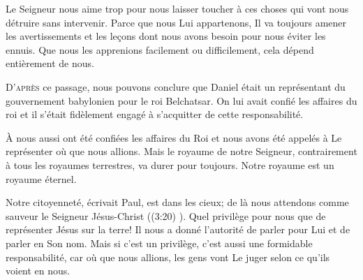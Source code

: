Le Seigneur nous aime trop pour nous laisser toucher à ces choses
 qui vont nous détruire sans intervenir. Parce que nous Lui appartenons,
 Il va toujours amener les avertissements et les le\c{c}ons
 dont nous avons besoin pour nous éviter les ennuis.
 Que nous les apprenions facilement ou difficilement,
 cela dépend entièrement de nous. 

\dvrule







\lettrine{D}{'après} ce passage,
 nous pouvons conclure que Daniel était un représentant du gouvernement
 babylonien pour le roi Belchatsar. On lui avait confié
 les affaires du roi et il s'était fidèlement engagé
 à s'acquitter de cette responsabilité. 

À nous aussi ont été confiées les affaires du Roi et nous avons été appelés
 à Le représenter où que nous allions. Mais le royaume de notre Seigneur,
 contrairement à tous les royaumes terrestres, 
 va durer pour toujours.  Notre royaume est un royaume éternel. 


\Og Notre citoyenneté, écrivait Paul, 
 est dans les cieux; de là nous attendons comme sauveur
 le Seigneur Jésus-Christ \Fg{} ((3:20) \NBS).
 Quel privilège pour nous que de représenter Jésus sur la terre!
 Il nous a donné l'autorité de parler pour Lui et de parler en Son nom.
 Mais si c'est un privilège, c'est aussi une formidable responsabilité,
 car où que nous allions, les gens vont Le juger selon ce qu'ils voient en nous. 


